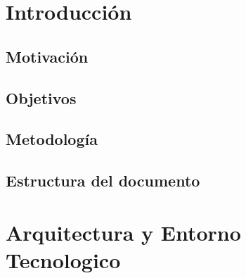 \documentclass[12pt, a4paper, twoside]{article}
\begin{document}


\clearpage
\setcounter{page}{1}



\newpage



\newpage



\tableofcontents



\section{Introducción}

\subsection{Motivación}

\newpage\cleardoublepage

\subsection{Objetivos}

\newpage\cleardoublepage

\subsection{Metodología}

\newpage\cleardoublepage

\subsection{Estructura del documento}

\newpage\cleardoublepage


\section{Arquitectura y Entorno Tecnologico}

\newpage\cleardoublepage
\end{document}
